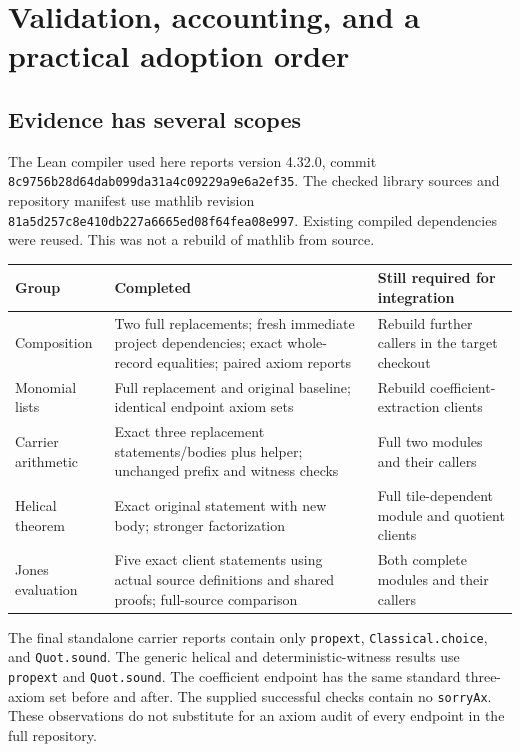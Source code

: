 \documentclass[11pt,letterpaper]{article}
\newcommand{\code}[1]{\nolinkurl{#1}}
\begin{document}
\section{Validation, accounting, and a practical adoption order}
\label{sec:validation}

\subsection{Evidence has several scopes}

The Lean compiler used here reports version 4.32.0, commit
\code{8c9756b28d64dab099da31a4c09229a9e6a2ef35}. The checked library sources and repository manifest use mathlib revision
\code{81a5d257c8e410db227a6665ed08f64fea08e997}. Existing compiled dependencies were reused. This was not a rebuild of mathlib from source.

\begin{center}
\small
\renewcommand{\arraystretch}{1.2}
\begin{tabularx}{\textwidth}{@{}>{\RaggedRight\arraybackslash}p{}>{\RaggedRight\arraybackslash}X >{\RaggedRight\arraybackslash}X@{}}
\toprule
Group & Completed & Still required for integration \\
\midrule
Composition & Two full replacements; fresh immediate project dependencies; exact whole-record equalities; paired axiom reports & Rebuild further callers in the target checkout \\
Monomial lists & Full replacement and original baseline; identical endpoint axiom sets & Rebuild coefficient-extraction clients \\
Carrier arithmetic & Exact three replacement statements/bodies plus helper; unchanged prefix and witness checks & Full two modules and their callers \\
Helical theorem & Exact original statement with new body; stronger factorization & Full tile-dependent module and quotient clients \\
Jones evaluation & Five exact client statements using actual source definitions and shared proofs; full-source comparison & Both complete modules and their callers \\
\bottomrule
\end{tabularx}
\end{center}

The final standalone carrier reports contain only \code{propext}, \code{Classical.choice}, and \code{Quot.sound}. The generic helical and deterministic-witness results use \code{propext} and \code{Quot.sound}. The coefficient endpoint has the same standard three-axiom set before and after. The supplied successful checks contain no \code{sorryAx}. These observations do not substitute for an axiom audit of every endpoint in the full repository.
\end{document}
